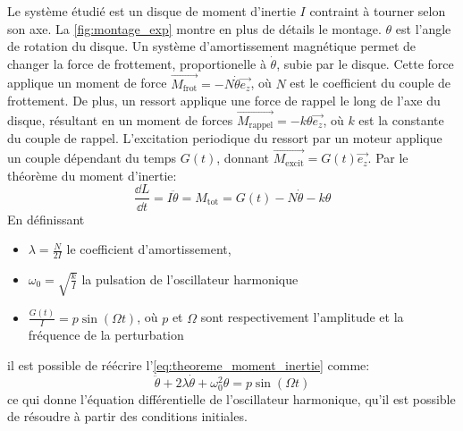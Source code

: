 Le système étudié est un disque de moment d'inertie \(I\) contraint à tourner selon son axe. La \autoref{fig:montage_exp} montre en plus de détails le montage. \(\theta\) est l'angle de rotation du disque. Un système d'amortissement magnétique permet de changer la force de frottement, proportionelle à \(\dot \theta\), subie par le disque. Cette force applique un moment de force \(\overrightarrow{M_\textrm{frot}} = -N \dot\theta \vec{e_z}\), où \(N\) est le coefficient du couple de frottement. De plus, un ressort applique une force de rappel le long de l'axe du disque, résultant en un moment de forces \(\overrightarrow{M_\textrm{rappel}} = -k \theta \vec{e_z}\), où \(k\) est la constante du couple de rappel. L'excitation periodique du ressort par un moteur applique un couple dépendant du temps \(G(t)\), donnant \(\overrightarrow{M_\textrm{excit}} = G(t) \vec{e_z}\). Par le théorème du moment d'inertie:
\begin{equation}
    \frac{\dd L}{\dd t} = I \ddot \theta = M_\textrm{tot} = G(t) - N \dot\theta - k\theta
    \label{eq:theoreme_moment_inertie}
\end{equation}
En définissant
\begin{itemize}
    \item \(\lambda = \frac{N}{2I}\) le coefficient d'amortissement,
    \item \(\omega_0 = \sqrt{\frac{k}{I}}\) la pulsation de l'oscillateur harmonique
    \item \(\frac{G(t)}{I} = p \sin (\Omega t)\), où \(p\) et \(\Omega\) sont respectivement l'amplitude et la fréquence de la perturbation
\end{itemize}
il est possible de réécrire l'\autoref{eq:theoreme_moment_inertie} comme:
\begin{equation}
    \ddot\theta + 2\lambda\dot\theta + \omega_0^2\theta = p \sin (\Omega t)
    \label{eq:mouvement}
\end{equation}
ce qui donne l'équation différentielle de l'oscillateur harmonique, qu'il est possible de résoudre à partir des conditions initiales.

